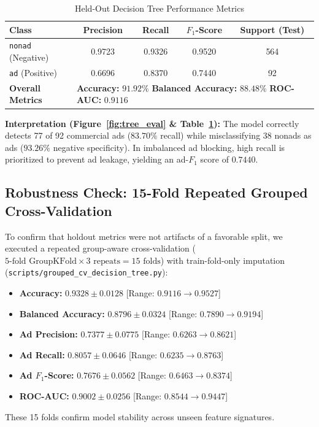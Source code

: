 \documentclass[11pt,a4paper]{article}
\begin{document}
\begin{table}[H]
\centering
\small
\caption{Held-Out Decision Tree Performance Metrics}
\label{tab:tree_metrics}
\begin{tabular}{lcccc}
\toprule
\textbf{Class} & \textbf{Precision} & \textbf{Recall} & \textbf{$F_1$-Score} & \textbf{Support (Test)} \\
\midrule
\texttt{nonad} (Negative) & 0.9723 & 0.9326 & 0.9520 & 564 \\
\texttt{ad} (Positive) & 0.6696 & 0.8370 & 0.7440 & 92 \\
\midrule
\textbf{Overall Metrics} & \multicolumn{4}{l}{\textbf{Accuracy:} $91.92\%$ \quad \textbf{Balanced Accuracy:} $88.48\%$ \quad \textbf{ROC-AUC:} $0.9116$} \\
\bottomrule
\end{tabular}
\end{table}

\noindent\textbf{Interpretation (Figure~\ref{fig:tree_eval} \& Table~\ref{tab:tree_metrics}):} The model correctly detects 77 of 92 commercial ads ($83.70\%$ recall) while misclassifying 38 nonads as ads ($93.26\%$ negative specificity). In imbalanced ad blocking, high recall is prioritized to prevent ad leakage, yielding an ad-$F_1$ score of $0.7440$.

\subsection{Robustness Check: 15-Fold Repeated Grouped Cross-Validation}
To confirm that holdout metrics were not artifacts of a favorable split, we executed a repeated group-aware cross-validation ($5\text{-fold GroupKFold} \times 3\text{ repeats} = 15\text{ folds}$) with train-fold-only imputation (\texttt{scripts/grouped\_cv\_decision\_tree.py}):
\begin{itemize}[noitemsep,topsep=2pt]
    \item \textbf{Accuracy:} $0.9328 \pm 0.0128$ [Range: $0.9116 \to 0.9527$]
    \item \textbf{Balanced Accuracy:} $0.8796 \pm 0.0324$ [Range: $0.7890 \to 0.9194$]
    \item \textbf{Ad Precision:} $0.7377 \pm 0.0775$ [Range: $0.6263 \to 0.8621$]
    \item \textbf{Ad Recall:} $0.8057 \pm 0.0646$ [Range: $0.6235 \to 0.8763$]
    \item \textbf{Ad $F_1$-Score:} $0.7676 \pm 0.0562$ [Range: $0.6463 \to 0.8374$]
    \item \textbf{ROC-AUC:} $0.9002 \pm 0.0256$ [Range: $0.8544 \to 0.9447$]
\end{itemize}
These 15 folds confirm model stability across unseen feature signatures.
\end{document}
